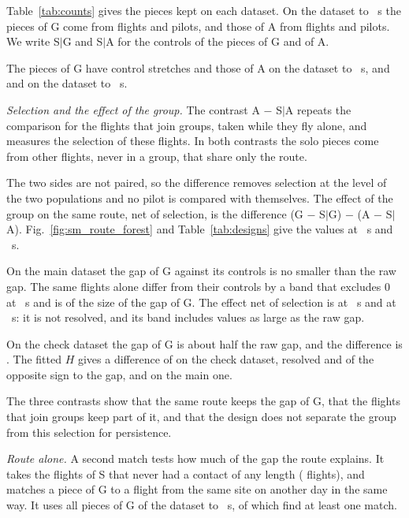 \documentclass[aps,prl,twocolumn,superscriptaddress,nofootinbib]{revtex4-2}
\begin{document}
Table~\ref{tab:counts} gives the pieces kept on each dataset. On the dataset to \LtTauOne~s the pieces
of G come from \LtRouteFlightsGOne{} flights and \LtRoutePilotsGOne{} pilots, and those of A from
\LtRouteFlightsAOne{} flights and \LtRoutePilotsAOne{} pilots. We write S$|$G and S$|$A for the
controls of the pieces of G and of A.

The pieces of G have \LtRouteControlsGOne{} control stretches and those of A \LtRouteControlsAOne{} on
the dataset to \LtTauOne~s, and \LtRouteControlsGTwo{} and \LtRouteControlsATwo{} on the dataset to
\LtTauTwo~s.

\emph{Selection and the effect of the group.} The contrast A $-$ S$|$A repeats the comparison for the
flights that join groups, taken while they fly alone, and measures the selection of these flights. In
both contrasts the solo pieces come from other flights, never in a group, that share only the route.

The two sides are not paired, so the difference removes selection at the level of the two populations
and no pilot is compared with themselves. The effect of the group on the same route, net of
selection, is the difference (G $-$ S$|$G) $-$ (A $-$ S$|$A). Fig.~\ref{fig:sm_route_forest} and
Table~\ref{tab:designs} give the values at \LtLagOne~s and \LtLagTwo~s.

On the main dataset the gap of G against its controls is no smaller than the raw gap. The same flights
alone differ from their controls by a band that excludes 0 at \LtLagTwo~s and is of the size of the gap
of G. The effect net of selection is \LtRouteAlphaKDiffTwo{} \LtRouteAlphaKDiffTwoBand{} at
\LtLagOne~s and \LtRouteAlphaQDiffTwo{} \LtRouteAlphaQDiffTwoBand{} at \LtLagTwo~s: it is not resolved,
and its band includes values as large as the raw gap.

On the check dataset the gap of G is about half the raw gap, and the difference is
\LtRouteAlphaKDiffOne{} \LtRouteAlphaKDiffOneBand. The fitted $H$ gives a difference of
\LtRouteFitDiffOne{} \LtRouteFitDiffOneBand{} on the check dataset, resolved and of the opposite sign
to the gap, and \LtRouteFitDiffTwo{} \LtRouteFitDiffTwoBand{} on the main one.

The three contrasts show that the same route keeps the gap of G, that the flights that join groups
keep part of it, and that the design does not separate the group from this selection for persistence.

\emph{Route alone.} A second match tests how much of the gap the route explains. It takes the flights
of S that never had a contact of any length (\RouteOpenAlone{} flights), and matches a piece of G to a
flight from the same site on another day in the same way. It uses all \RouteOpenSample{} pieces of G
of the dataset to \LtTauOne~s, of which \RouteOpenPieces{} find at least one match.
\end{document}
